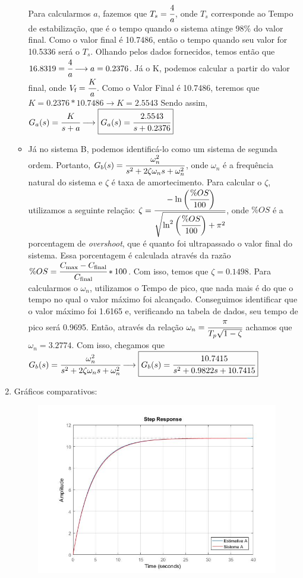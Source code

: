 \documentclass[a4paper,11pt]{article}
\begin{document}
\begin{enumerate}
\begin{itemize}
		\\
		Para calcularmos $a$, fazemos que $T_s = \cfrac{4}{a}$, onde $T_s$ corresponde ao Tempo de estabilização, que é o tempo quando o sistema atinge 98\% do valor final. Como o valor final é 10.7486, então o tempo quando seu valor for 10.5336 será o $T_s$. Olhando pelos dados fornecidos, temos então que $16.8319 = \cfrac{4}{a}\longrightarrow a = 0.2376$.
		\vskip0.1cm
		Já o K, podemos calcular a partir do valor final, onde $V_\text{f}= \cfrac{K}{a}$. Como o Valor Final é 10.7486, teremos que
		\vskip0.1cm
		$K = 0.2376*10.7486\longrightarrow K=2.5543$
		\vskip0.1cm
		Sendo assim, $G_a(s) = \cfrac{K}{s+a}\longrightarrow \boxed{G_a(s) = \cfrac{2.5543}{s + 0.2376}}$
		\item Já no sistema B, podemos identificá-lo como um sistema de segunda ordem. Portanto, $G_b(s) = \cfrac{\omega_n^2}{s^2 +2\zeta \omega_n s+\omega_n^2}$, onde $\omega_n$ é a
		\vskip0.1cm
		frequência natural do sistema e $\zeta$ é taxa de amortecimento. Para calcular o $\zeta$, utilizamos a seguinte relação: $\zeta = \cfrac{-\ln\bigg(\cfrac{\%OS}{100}\bigg)}{\sqrt{\ln^2\bigg(\cfrac{\%OS}{100}\bigg) + \pi^2}} $, onde $\%OS$ é a porcentagem de \textit{overshoot}, que é quanto foi ultrapassado o valor final do sistema. Essa porcentagem é calculada através da razão $\%OS = \cfrac{C_\text{max} - C_\text{final}}{C_\text{final}} * 100$. Com isso, temos que $\zeta = 0.1498 $. Para calcularmos o $\omega_n$, utilizamos o Tempo de pico, que nada mais é do que o tempo no qual o valor máximo foi alcançado. Conseguimos identificar que o valor máximo foi 1.6165 e, verificando na tabela de dados, seu tempo de pico será 0.9695. Então, através da relação $\omega_n=\cfrac{\pi}{T_p\sqrt{1-\zeta}}$ achamos que $\omega_n = 3.2774 $. Com isso, chegamos que $G_b(s) = \cfrac{\omega_n^2}{s^2 +2\zeta \omega_n s+\omega_n^2} \longrightarrow\\ \boxed{G_b(s) = \cfrac{10.7415}{s^2 + 0.9822s + 10.7415}}$
	\end{itemize}
\item Gráficos comparativos:
	\begin{figure}[!h]  \includegraphics [scale=0.5] {Figures/systemAcomparison} \end{figure}

\end{enumerate}
\end{document}
